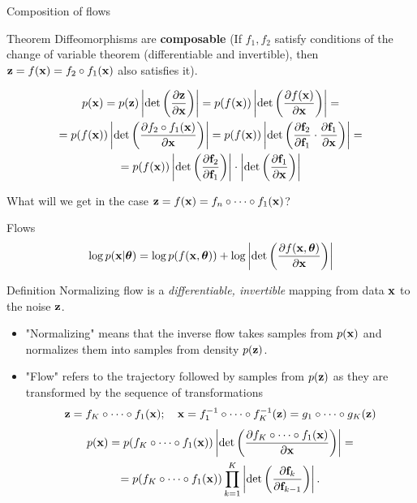 \begin{frame}{Composition of flows}
	\begin{block}{Theorem}
		Diffeomorphisms are \textbf{composable} (If $f_1, f_2$ satisfy conditions of the change of variable theorem (differentiable and invertible), then $\mathbf{z} = f(\mathbf{x}) = f_2 \circ f_1(\mathbf{x})$ also satisfies it).
	\end{block}
	\begin{multline*}
		p(\mathbf{x}) = p(\mathbf{z}) \left|\det \left(  \frac{\partial \mathbf{z}}{\partial \mathbf{x}} \right) \right| = p(f(\mathbf{x})) \left|\det \left(  \frac{\partial f(\mathbf{x})}{\partial \mathbf{x}} \right) \right| = \\
		= p(f(\mathbf{x})) \left|\det \left(\frac{\partial f_2 \circ f_1(\mathbf{x})}{\partial \mathbf{x}} \right) \right| =
		p(f(\mathbf{x})) \left|\det \left(\frac{\partial \textbf{f}_2}{\partial \textbf{f}_1} \cdot \frac{\partial \textbf{f}_1}{\partial \mathbf{x}} \right) \right| = \\
		= p(f(\mathbf{x}))  \left|\det \left(\frac{\partial \textbf{f}_2}{\partial \textbf{f}_1} \right) \right| \cdot \left| \det \left( \frac{\partial \textbf{f}_1}{\partial \mathbf{x}} \right) \right|
	\end{multline*}

	What will we get in the case $\mathbf{z} = f(\mathbf{x}) = f_n \circ \dots \circ f_1(\mathbf{x})$?
\end{frame}
\begin{frame}{Flows}
	\vspace{-0.3cm}
	\[
		\log p(\mathbf{x}|\boldsymbol{\theta}) = \log p(f(\mathbf{x}, \boldsymbol{\theta})) + \log \left|\det \left( \frac{\partial f(\mathbf{x}, \boldsymbol{\theta})}{\partial \mathbf{x}} \right) \right|
	\]
	\vspace{-0.3cm}
	\begin{block}{Definition}
		Normalizing flow is a \textit{differentiable, invertible} mapping from data $\mathbf{x}$ to the noise $\mathbf{z}$. 
	\end{block}
	\begin{itemize}
		\item "Normalizing" means that the inverse flow takes samples from $p(\mathbf{x})$ and normalizes them into samples from density $p(\mathbf{z})$.
		\item "Flow" refers to the trajectory followed by samples from $p(\mathbf{z})$ as they are transformed by the sequence of transformations
		\[
		\mathbf{z} = f_K \circ \dots \circ f_1(\mathbf{x}); \quad \mathbf{x} = f_1^{-1} \circ \dots \circ f_K^{-1} (\mathbf{z}) = g_1 \circ \dots \circ g_K(\mathbf{z}) 
		\] 
		\begin{multline*}
			p(\mathbf{x}) = p(f_K \circ \dots \circ f_1(\mathbf{x})) \left|\det \left(\frac{\partial f_K \circ \dots \circ f_1(\mathbf{x})}{\partial \mathbf{x}} \right) \right| = \\
			= p(f_K \circ \dots \circ f_1(\mathbf{x})) \prod_{k=1}^K \left|\det \left(\frac{\partial \mathbf{f}_k}{\partial \mathbf{f}_{k-1}} \right) \right|.
		\end{multline*}
	\end{itemize}
\end{frame}
